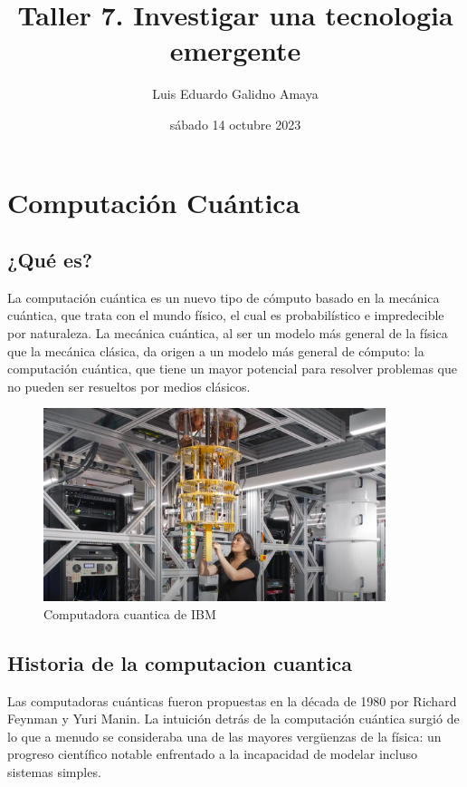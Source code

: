 \documentclass[11pt]{article}
\author{Luis Eduardo Galidno Amaya}
\date{sábado 14 octubre 2023}
\title{Taller 7. Investigar una tecnologia emergente}
\begin{document}
\makeatletter
{}

\section{Computación Cuántica}
\label{sec:org8fedb1a}

\subsection{¿Qué es?}
\label{sec:org47b9f56}
\autocite{Marella_Parisa_2020} La computación cuántica es un nuevo tipo de cómputo basado en la mecánica cuántica, que trata con el mundo físico, el cual es probabilístico e impredecible por naturaleza. La mecánica cuántica, al ser un modelo más general de la física que la mecánica clásica, da origen a un modelo más general de cómputo: la computación cuántica, que tiene un mayor potencial para resolver problemas que no pueden ser resueltos por medios clásicos.

\begin{figure}[htbp]
\centering
\includegraphics[width=10cm]{img/q.png}
\caption{Computadora cuantica de IBM}
\end{figure}

\subsection{Historia de la computacion cuantica}
\label{sec:org772fa63}
\autocite{Lopez_2023} Las computadoras cuánticas fueron propuestas en la década de 1980 por Richard Feynman y Yuri Manin. La intuición detrás de la computación cuántica surgió de lo que a menudo se consideraba una de las mayores vergüenzas de la física: un progreso científico notable enfrentado a la incapacidad de modelar incluso sistemas simples.
\end{document}
